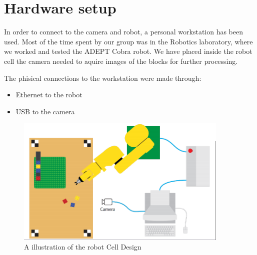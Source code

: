 \chapter{Hardware setup}\label{ch:hardware}
In order to connect to the camera and robot, a personal workstation has been used. Most of the time spent by our group was in the Robotics laboratory, where we worked and tested the ADEPT Cobra robot. We have placed inside the robot cell the camera needed to aquire images of the blocks for further processing. 

The phisical connections to the workstation were made through: 
\begin{itemize}
	\item Ethernet to the robot  
	\item USB to the camera 
\end{itemize}

\begin{figure}[hb]
\centering
\includegraphics[width=4in]{figures/robotCellDesign.png}
\caption[robot Cell Design]
{A illustration of the robot Cell Design}
\end{figure}